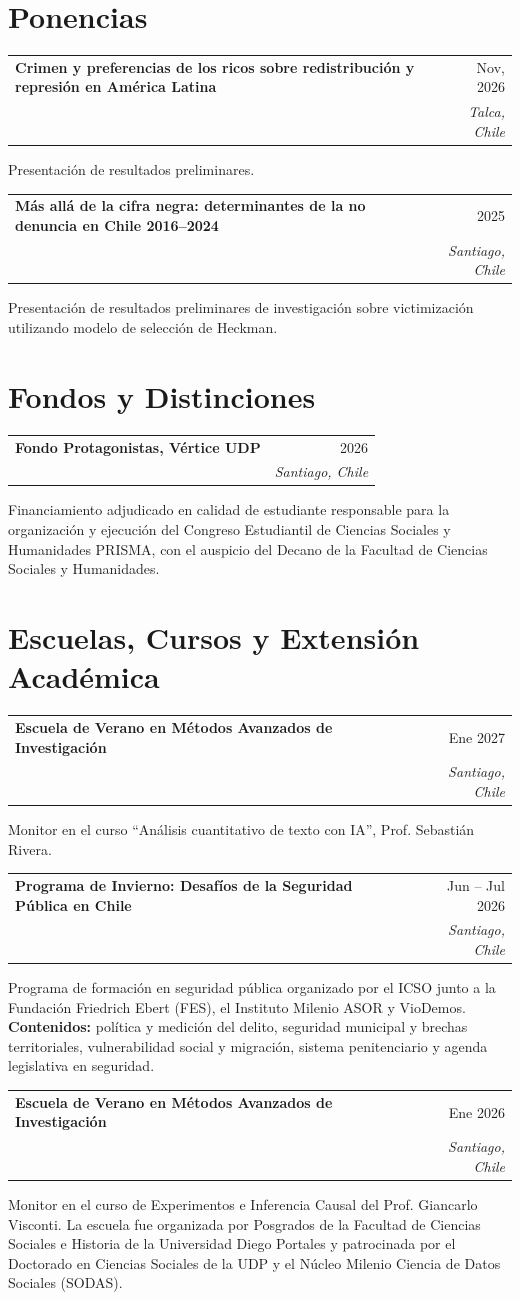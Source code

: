 \documentclass[a4paper,10pt]{article}
\makeatletter
\newcommand{\experience}[5]{%
    \par\noindent\begin{minipage}{\linewidth}%
        \renewcommand{\arraystretch}{0.92}%
        \begin{tabularx}{\linewidth}{@{}>{\raggedright\arraybackslash}X@{\hspace{1em}}r@{}}%
            \textbf{#1} & {#2}\\
            {\itshape #3} & {\itshape #4}%
        \end{tabularx}\par
        #5%
    \end{minipage}\par\addvspace{2pt}%
}
\makeatother
\begin{document}
\section*{Ponencias}

\experience{Crimen y preferencias de los ricos sobre redistribución y represión en América Latina}{Nov, 2026}{Congreso de la Sociedad Chilena de Criminología}{Talca, Chile}{
    Presentación de resultados preliminares.
}

\experience{Más allá de la cifra negra: determinantes de la no denuncia en Chile 2016--2024}{2025}{Congreso Estudiantil de Ciencia Política, UDP}{Santiago, Chile}{
    Presentación de resultados preliminares de investigación sobre victimización utilizando modelo de selección de Heckman.
}

\section*{Fondos y Distinciones}

\experience{Fondo Protagonistas, Vértice UDP}{2026}{Universidad Diego Portales}{Santiago, Chile}{
    Financiamiento adjudicado en calidad de estudiante responsable para la organización y ejecución del Congreso Estudiantil de Ciencias Sociales y Humanidades PRISMA, con el auspicio del Decano de la Facultad de Ciencias Sociales y Humanidades.
}

\section*{Escuelas, Cursos y Extensión Académica}
\experience{Escuela de Verano en Métodos Avanzados de Investigación}{Ene 2027}{Facultad de Ciencias Sociales y Humanidades, UDP}{Santiago, Chile}{
    Monitor en el curso ``Análisis cuantitativo de texto con IA'', Prof. Sebastián Rivera.
}

\experience{Programa de Invierno: Desafíos de la Seguridad Pública en Chile}{Jun -- Jul 2026}{Instituto de Investigación en Ciencias Sociales (ICSO), UDP}{Santiago, Chile}{
    Programa de formación en seguridad pública organizado por el ICSO junto a la Fundación Friedrich Ebert (FES), el Instituto Milenio ASOR y VioDemos. \textbf{Contenidos:} política y medición del delito, seguridad municipal y brechas territoriales, vulnerabilidad social y migración, sistema penitenciario y agenda legislativa en seguridad.
}

\experience{Escuela de Verano en Métodos Avanzados de Investigación}{Ene 2026}{Facultad de Ciencias Sociales y Humanidades, UDP}{Santiago, Chile}{
    Monitor en el curso de Experimentos e Inferencia Causal del Prof. Giancarlo Visconti. La escuela fue organizada por Posgrados de la Facultad de Ciencias Sociales e Historia de la Universidad Diego Portales y patrocinada por el Doctorado en Ciencias Sociales de la UDP y el Núcleo Milenio Ciencia de Datos Sociales (SODAS).
}
\end{document}
